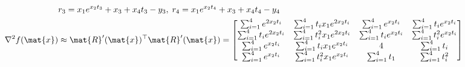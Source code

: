 \begin{answer}
\begin{align}
    & r_3 = x_1e^{x_2t_3}+x_3+x_4t_3-y_3,\; r_4 = x_1e^{x_2t_4}+x_3+x_4t_4-y_4\\
    \nabla^2 f(\mat{x}) &\approx \mat{R}'(\mat{x})^\top \mat{R}'(\mat{x}) = \left[\begin{matrix}
        \sum_{i = 1}^{4}{e^{2x_2t_i}} & \sum_{i=1}^{4}{t_ix_1e^{2x_2t_i}} & \sum_{i = 1}^{4}{e^{x_2t_i}} & \sum_{i = 1}^{4}{t_ie^{x_2t_i}}\\
        \sum_{i = 1}^{4}{t_ie^{2x_2t_i}} & \sum_{i=1}^{4}{t_i^2x_1e^{2x_2t_i}} & \sum_{i = 1}^{4}{t_ie^{x_2t_i}} & \sum_{i = 1}^{4}{t_i^2e^{x_2t_i}}\\
        \sum_{i = 1}^{4}{e^{x_2t_i}} & \sum_{i=1}^{4}{t_ix_1e^{x_2t_i}} & 4 & \sum_{i = 1}^{4}{t_i}\\
        \sum_{i = 1}^{4}{e^{x_2t_i}} & \sum_{i=1}^{4}{t_i^2x_1e^{x_2t_i}} & \sum_{i = 1}^{4}{t_1} & \sum_{i = 1}^{4}{t_i^2}
    \end{matrix}\right]
    \end{align}
\end{answer}